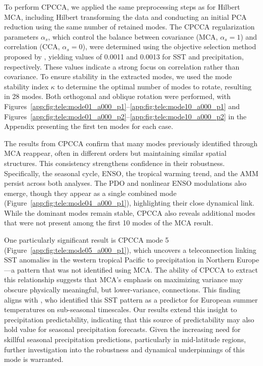 To perform CPCCA, we applied the same preprocessing steps as for Hilbert MCA, including Hilbert transforming the data and conducting an initial PCA reduction using the same number of retained modes. The CPCCA regularization parameters $\alpha_s$, which control the balance between covariance (MCA, $\alpha_s=1$) and correlation (CCA, $\alpha_s=0$), were determined using the objective selection method proposed by \citet{swenson_continuum_2015}, yielding values of \num{0.0011} and \num{0.0013} for SST and precipitation, respectively. These values indicate a strong focus on correlation rather than covariance. To ensure stability in the extracted modes, we used the mode stability index $\kappa$ to determine the optimal number of modes to rotate, resulting in 28 modes. Both orthogonal and oblique rotation were performed, with Figures~\ref{app:fig:tele:mode01_a000_p1}--\ref{app:fig:tele:mode10_a000_p1} and Figures~\ref{app:fig:tele:mode01_a000_p2}--\ref{app:fig:tele:mode10_a000_p2} in the Appendix presenting the first ten modes for each case.

The results from CPCCA confirm that many modes previously identified through MCA reappear, often in different orders but maintaining similar spatial structures. This consistency strengthens confidence in their robustness. Specifically, the seasonal cycle, ENSO, the tropical warming trend, and the AMM persist across both analyses. The PDO and nonlinear ENSO modulations also emerge, though they appear as a single combined mode (Figure~\ref{app:fig:tele:mode04_a000_p1}), highlighting their close dynamical link. While the dominant modes remain stable, CPCCA also reveals additional modes that were not present among the first 10 modes of the MCA result.

One particularly significant result is CPCCA mode 5 (Figure~\ref{app:fig:tele:mode05_a000_p1}), which uncovers a teleconnection linking SST anomalies in the western tropical Pacific to precipitation in Northern Europe---a pattern that was not identified using MCA. The ability of CPCCA to extract this relationship suggests that MCA's emphasis on maximizing variance may obscure physically meaningful, but lower-variance, connections. This finding aligns with \citet{straaten_correcting_2023}, who identified this SST pattern as a predictor for European summer temperatures on sub-seasonal timescales. Our results extend this insight to precipitation predictability, indicating that this source of predictability may also hold value for seasonal precipitation forecasts. Given the increasing need for skillful seasonal precipitation predictions, particularly in mid-latitude regions, further investigation into the robustness and dynamical underpinnings of this mode is warranted.


